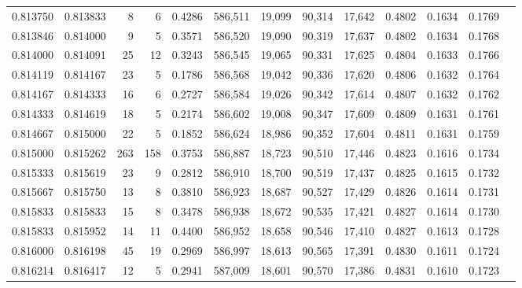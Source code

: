 \begin{tabular}{rrrrrrrrrrrrr}
0.813750 & 0.813833 &     8 &   6 &                                     0.4286 & 586,511 &  19,099 &  90,314 &  17,642 & 0.4802 & 0.1634 & 0.1769 \\
0.813846 & 0.814000 &     9 &   5 &                                     0.3571 & 586,520 &  19,090 &  90,319 &  17,637 & 0.4802 & 0.1634 & 0.1768 \\
0.814000 & 0.814091 &    25 &  12 &                                     0.3243 & 586,545 &  19,065 &  90,331 &  17,625 & 0.4804 & 0.1633 & 0.1766 \\
0.814119 & 0.814167 &    23 &   5 &                                     0.1786 & 586,568 &  19,042 &  90,336 &  17,620 & 0.4806 & 0.1632 & 0.1764 \\
0.814167 & 0.814333 &    16 &   6 &                                     0.2727 & 586,584 &  19,026 &  90,342 &  17,614 & 0.4807 & 0.1632 & 0.1762 \\
0.814333 & 0.814619 &    18 &   5 &                                     0.2174 & 586,602 &  19,008 &  90,347 &  17,609 & 0.4809 & 0.1631 & 0.1761 \\
0.814667 & 0.815000 &    22 &   5 &                                     0.1852 & 586,624 &  18,986 &  90,352 &  17,604 & 0.4811 & 0.1631 & 0.1759 \\
0.815000 & 0.815262 &   263 & 158 &                                     0.3753 & 586,887 &  18,723 &  90,510 &  17,446 & 0.4823 & 0.1616 & 0.1734 \\
0.815333 & 0.815619 &    23 &   9 &                                     0.2812 & 586,910 &  18,700 &  90,519 &  17,437 & 0.4825 & 0.1615 & 0.1732 \\
0.815667 & 0.815750 &    13 &   8 &                                     0.3810 & 586,923 &  18,687 &  90,527 &  17,429 & 0.4826 & 0.1614 & 0.1731 \\
0.815833 & 0.815833 &    15 &   8 &                                     0.3478 & 586,938 &  18,672 &  90,535 &  17,421 & 0.4827 & 0.1614 & 0.1730 \\
0.815833 & 0.815952 &    14 &  11 &                                     0.4400 & 586,952 &  18,658 &  90,546 &  17,410 & 0.4827 & 0.1613 & 0.1728 \\
0.816000 & 0.816198 &    45 &  19 &                                     0.2969 & 586,997 &  18,613 &  90,565 &  17,391 & 0.4830 & 0.1611 & 0.1724 \\
0.816214 & 0.816417 &    12 &   5 &                                     0.2941 & 587,009 &  18,601 &  90,570 &  17,386 & 0.4831 & 0.1610 & 0.1723 \\

\end{tabular}
